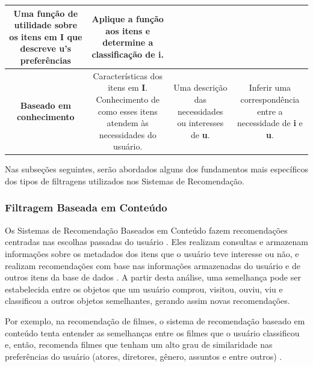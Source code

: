 \begin{table}[ht]
\begin{tabular}{cccc}
\begin{minipage} [t] {0.2\textwidth}
		Uma função de utilidade sobre os itens em \textbf{I} que descreve \textbf{u}'s preferências \end{minipage}   & \begin{minipage} [t] {0.2\textwidth} Aplique a função aos itens e determine a classificação de \textbf{i}.  \end{minipage}  \\ 
		\midrule
		\textbf{Baseado em conhecimento}  & \begin{minipage} [t] {0.2\textwidth} \centering Características dos itens em \textbf{I}. Conhecimento de como esses itens atendem às necessidades do usuário.  \end{minipage}  & \begin{minipage} [t] {0.2\textwidth} Uma descrição das necessidades ou interesses de \textbf{u}.\end{minipage}  &  \begin{minipage} [t] {0.2\textwidth}  
		Inferir uma correspondência entre a necessidade de \textbf{i} e \textbf{u}. \end{minipage} \\ 
	\bottomrule
	\end{tabular}
\end{table}



Nas subseções seguintes, serão abordados alguns dos fundamentos mais específicos dos tipos de filtragens utilizados nos Sistemas de Recomendação.


\subsubsection{Filtragem Baseada em Conteúdo}


Os Sistemas de Recomendação Baseados em Conteúdo fazem recomendações centradas nas escolhas passadas do usuário \cite{bobadilla2013}. 
Eles realizam consultas e armazenam informações sobre os metadados dos itens que o usuário teve interesse ou não, e realizam recomendações 
com base nas informações armazenadas do usuário e de outros itens da base de dados \cite{mauricio}. A partir desta análise, uma semelhança pode ser
estabelecida entre os objetos que um usuário comprou, visitou, ouviu, viu e classificou a outros objetos semelhantes, gerando assim novas recomendações. 

Por exemplo, na recomendação de filmes, o sistema de recomendação baseado em conteúdo 
tenta entender as semelhanças entre os filmes que o usuário classificou e, então, recomenda filmes 
que tenham um alto grau de similaridade nas preferências do usuário (atores, diretores, gênero, assuntos e entre outros) \cite{adomavicius2005}.

